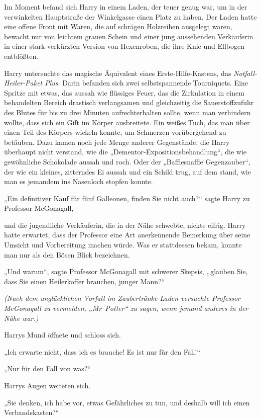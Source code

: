 {Im Moment befand sich Harry in einem Laden, der teuer genug war, um in der verwinkelten Hauptstraße der Winkelgasse einen Platz zu haben. Der Laden hatte eine offene Front mit Waren, die auf schrägen Holzreihen ausgelegt waren, bewacht nur von leichtem grauen Schein und einer jung aussehenden Verkäuferin in einer stark verkürzten Version von Hexenroben, die ihre Knie und Ellbogen entblößten.

Harry untersuchte das magische Äquivalent eines Erste-Hilfe-Kastens, das \emph{Notfall-Heiler-Paket Plus}. Darin befanden sich zwei selbstspannende Tourniquets. Eine Spritze mit etwas, das aussah wie flüssiges Feuer, das die Zirkulation in einem behandelten Bereich drastisch verlangsamen und gleichzeitig die Sauerstoffzufuhr des Blutes für bis zu drei Minuten aufrechterhalten sollte, wenn man verhindern wollte, dass sich ein Gift im Körper ausbreitete. Ein weißes Tuch, das man über einen Teil des Körpers wickeln konnte, um Schmerzen vorübergehend zu betäuben. Dazu kamen noch jede Menge anderer Gegenstände, die Harry überhaupt nicht verstand, wie die „Dementor-Expositionsbehandlung“, die wie gewöhnliche Schokolade aussah und roch. Oder der „Bafflesnaffle Gegenzauber“, der wie ein kleines, zitterndes Ei aussah und ein Schild trug, auf dem stand, wie man es jemandem ins Nasenloch stopfen konnte.

„Ein definitiver Kauf für fünf Galleonen, finden Sie nicht auch?“ sagte Harry zu Professor McGonagall,

und die jugendliche Verkäuferin, die in der Nähe schwebte, nickte eifrig. Harry hatte erwartet, dass der Professor eine Art anerkennende Bemerkung über seine Umsicht und Vorbereitung machen würde. Was er stattdessen bekam, konnte man nur als den Bösen Blick bezeichnen.

„Und warum“, sagte Professor McGonagall mit schwerer Skepsis, „glauben Sie, dass Sie einen Heilerkoffer brauchen, junger Mann?“

\emph{(Nach dem unglücklichen Vorfall im Zaubertränke-Laden versuchte Professor McGonagall zu vermeiden, „Mr~Potter“ zu sagen, wenn jemand anderes in der Nähe war.)}

Harrys Mund öffnete und schloss sich.

„Ich erwarte nicht, dass ich es brauche! Es ist nur für den Fall!“

„Nur für den Fall von was?“

Harrys Augen weiteten sich.

„Sie denken, ich habe vor, etwas Gefährliches zu tun, und deshalb will ich einen Verbandskasten?“

}
